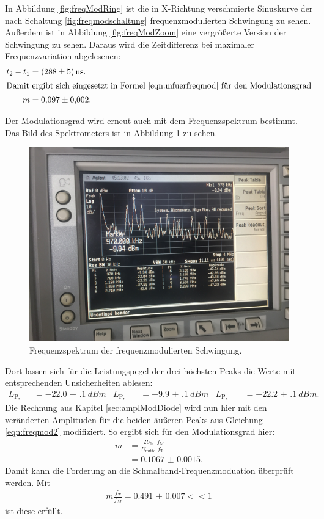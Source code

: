 In Abbildung \ref{fig:freqModRing} ist die in X-Richtung verschmierte Sinuskurve der nach Schaltung \ref{fig:freqmodschaltung} frequenzmodulierten Schwingung zu sehen. Außerdem ist in Abbildung \ref{fig:freqModZoom} eine vergrößerte Version der Schwingung zu sehen. Daraus wird die Zeitdifferenz bei maximaler Frequenzvariation abgelesenen:
\begin{align*}
  t_2 - t_1 &= \SI{288(5)}{\nano\second}.\\
\intertext{Damit ergibt sich eingesetzt in Formel \eqref{eqn:mfuerfreqmod} für den Modulationsgrad}
  m &= \num{0.097(2)}.
\end{align*}

Der Modulationsgrad wird erneut auch mit dem Frequenzspektrum bestimmt. Das Bild des Spektrometers ist in Abbildung \ref{fig:freqModSpek} zu sehen.
\begin{figure}[h]
  \centering
  \includegraphics[width=.9\textwidth]{Spektrum_Pics/d.jpg}
  \caption{Frequenzspektrum der frequenzmodulierten Schwingung.}
  \label{fig:freqModSpek}
\end{figure}
Dort lassen sich für die Leistungspegel der drei höchsten Peaks die Werte mit entsprechenden Unsicherheiten ablesen:
\begin{align*}
  L_\text{P, links} &= \SI{-22.0(1)}{dBm} & L_\text{P, mitte} &= \SI{-9.9(1)}{dBm} & L_\text{P, rechts} &= \SI{-22.2(1)}{dBm}.
\end{align*}
Die Rechnung aus Kapitel \ref{sec:amplModDiode} wird nun hier mit den veränderten Amplituden für die beiden äußeren Peaks aus Gleichung \eqref{eqn:freqmod2} modifiziert. So ergibt sich für den Modulationsgrad hier:
\begin{align*}
  m &= \frac{2 U_\text{lr}}{U_\text{mitte}} \frac{f_\text{M}}{f_\text{T}}\\
  &= \num{0.1067(15)}.
\end{align*}
Damit kann die Forderung an die Schmalband-Frequenzmoduation überprüft werden. Mit
\begin{align*}
  m \frac{f_T}{f_M} = \num{0.491(7)} << 1
\end{align*}
ist diese erfüllt.

